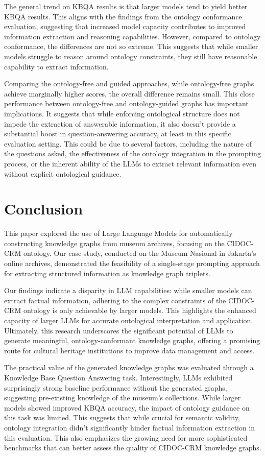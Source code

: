 \documentclass[a4, conference]{IEEEtran}
\begin{document}
The general trend on KBQA results is that larger models tend to yield better KBQA results. This aligns with the findings from the ontology conformance evaluation, suggesting that increased model capacity contributes to improved information extraction and reasoning capabilities. However, compared to ontology conformance, the differences are not so extreme. This suggests that while smaller models struggle to reason around ontology constraints, they still have reasonable capability to extract information.

Comparing the ontology-free and guided approaches, while ontology-free graphs achieve marginally higher scores, the overall difference remains small. This close performance between ontology-free and ontology-guided graphs has important implications. It suggests that while enforcing ontological structure does not impede the extraction of answerable information, it also doesn't provide a substantial boost in question-answering accuracy, at least in this specific evaluation setting. This could be due to several factors, including the nature of the questions asked, the effectiveness of the ontology integration in the prompting process, or the inherent ability of the LLMs to extract relevant information even without explicit ontological guidance.

\section{Conclusion}

This paper explored the use of Large Language Models for automatically constructing knowledge graphs from museum archives, focusing on the CIDOC-CRM ontology. Our case study, conducted on the Museum Nasional in Jakarta's online archives, demonstrated the feasibility of a single-stage prompting approach for extracting structured information as knowledge graph triplets.

Our findings indicate a disparity in LLM capabilities: while smaller models can extract factual information, adhering to the complex constraints of the CIDOC-CRM ontology is only achievable by larger models. This highlights the enhanced capacity of larger LLMs for accurate ontological interpretation and application. Ultimately, this research underscores the significant potential of LLMs to generate meaningful, ontology-conformant knowledge graphs, offering a promising route for cultural heritage institutions to improve data management and access.

The practical value of the generated knowledge graphs was evaluated through a Knowledge Base Question Answering task. Interestingly, LLMs exhibited surprisingly strong baseline performance without the generated graphs, suggesting pre-existing knowledge of the museum's collections. While larger models showed improved KBQA accuracy, the impact of ontology guidance on this task was limited. This suggests that while crucial for semantic validity, ontology integration didn't significantly hinder factual information extraction in this evaluation. This also emphasizes the growing need for more sophisticated benchmarks that can better assess the quality of CIDOC-CRM knowledge graphs.
\end{document}
